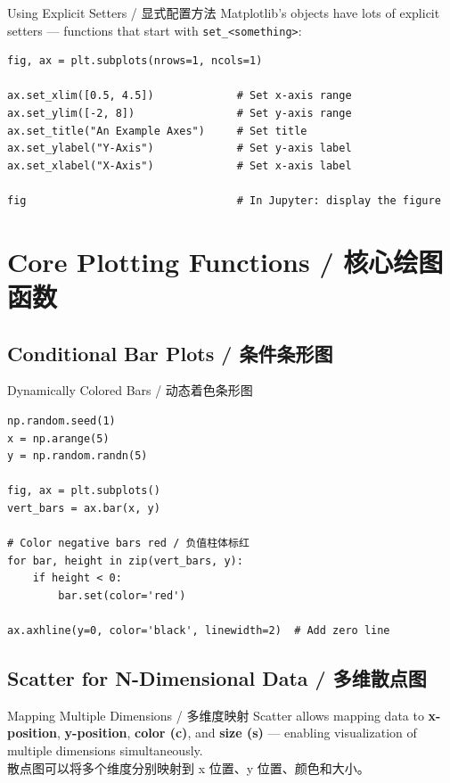\documentclass[11pt,a4paper]{report}
\let\oldtexttt\texttt
\renewcommand{\texttt}[1]{\textcolor{mainblue}{\oldtexttt{#1}}}
\begin{document}
\begin{examplebox}{Using Explicit Setters / 显式配置方法}
    Matplotlib's objects have lots of explicit setters — functions that start with \texttt{set\_<something>}:
\begin{lstlisting}
fig, ax = plt.subplots(nrows=1, ncols=1)

ax.set_xlim([0.5, 4.5])             # Set x-axis range
ax.set_ylim([-2, 8])                # Set y-axis range
ax.set_title("An Example Axes")     # Set title
ax.set_ylabel("Y-Axis")             # Set y-axis label
ax.set_xlabel("X-Axis")             # Set x-axis label

fig                                 # In Jupyter: display the figure
\end{lstlisting}
\end{examplebox}

\section{Core Plotting Functions / 核心绘图函数}

\subsection{Conditional Bar Plots / 条件条形图}

\begin{examplebox}{Dynamically Colored Bars / 动态着色条形图}
\begin{lstlisting}
np.random.seed(1)
x = np.arange(5)
y = np.random.randn(5)

fig, ax = plt.subplots()
vert_bars = ax.bar(x, y)

# Color negative bars red / 负值柱体标红
for bar, height in zip(vert_bars, y):
    if height < 0:
        bar.set(color='red')

ax.axhline(y=0, color='black', linewidth=2)  # Add zero line
\end{lstlisting}
\end{examplebox}

\subsection{Scatter for N-Dimensional Data / 多维散点图}

\begin{concept}{Mapping Multiple Dimensions / 多维度映射}
    Scatter allows mapping data to \textbf{x-position}, \textbf{y-position}, \textbf{color (c)}, and \textbf{size (s)} — enabling visualization of multiple dimensions simultaneously. \\
    散点图可以将多个维度分别映射到 x 位置、y 位置、颜色和大小。
\end{concept}
\end{document}
